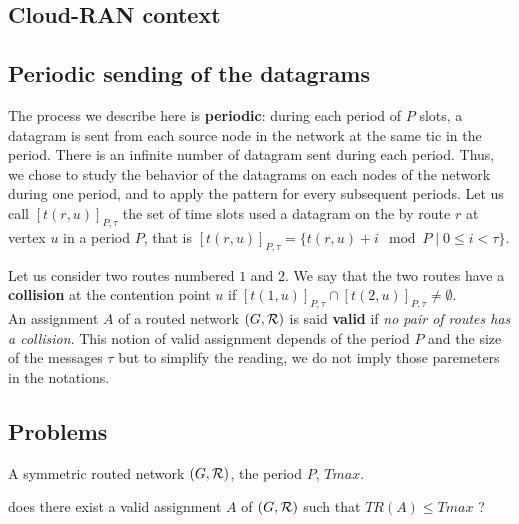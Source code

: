 \documentclass[english]{article}
\begin{document}
  \subsection{Cloud-RAN context}
     

     
  \subsection{Periodic sending of the datagrams}
 The process we describe here is \textbf{periodic}: during each period of $P$ slots, a datagram is sent from each source node in the network at the same tic in the period. There is an infinite number of datagram sent during each period. Thus, we chose to study the behavior of the datagrams on each nodes of the network during one period, and to apply the pattern for every subsequent periods.
             Let us call $[t(r,u)]_{P,\tau}$ the set of time slots used a datagram on the by route $r$ at vertex $u$ in a period $P$, that is $[t(r,u)]_{P,\tau} = \{t(r,u) + i \mod P \mid 0 \leq i < \tau \}$. 

      Let us consider two routes numbered $1$ and $2$.
      We say that the two routes have a {\bf collision} at the contention point $u$ if $[t(1,u)]_{P,\tau} \cap [t(2,u)]_{P,\tau} \neq \emptyset$.\\

        An assignment $A$ of a routed network $(G,{\cal R})$ is said \textbf{valid} if \emph{no pair of routes has a collision}. This notion of valid assignment depends of the period $P$ and the size of the messages $\tau$ but to simplify the reading, we do not imply those paremeters in the notations.
        
\subsection{Problems}
       

        A symmetric routed network $(G,{\cal R})$, the period $P$, $Tmax$.
      
       does there exist a valid assignment $A$ of $(G,{\cal R})$ such that $ TR(A) \leq Tmax$ ?
\end{document}
